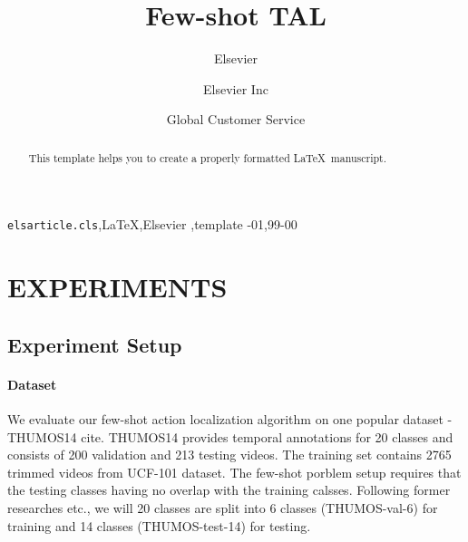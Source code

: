 \documentclass[review]{elsarticle}
\newcommand{\yl}[1]{\textcolor[rgb]{1.00,0.00,0.00}{#1}}
\begin{document}
\begin{frontmatter}

\title{Few-shot TAL}

\author{Elsevier}
\address{Radarweg 29, Amsterdam}

\author[mymainaddress,mysecondaryaddress]{Elsevier Inc}

\author[mysecondaryaddress]{Global Customer Service}

\address[mymainaddress]{1600 John F Kennedy Boulevard, Philadelphia}
\address[mysecondaryaddress]{360 Park Avenue South, New York}

\begin{abstract}
This template helps you to create a properly formatted \LaTeX\ manuscript.
\end{abstract}

\begin{keyword}
\texttt{elsarticle.cls}\sep \LaTeX\sep Elsevier \sep template
-01\sep  99-00
\end{keyword}

\end{frontmatter}

\linenumbers

\section{EXPERIMENTS}
\subsection{Experiment Setup}

\paragraph{Dataset} We evaluate our few-shot action localization algorithm on one popular dataset - THUMOS14 \yl{cite}. THUMOS14 provides temporal annotations for 20 classes and consists of 200 validation and 213 testing videos. The training set contains 2765 trimmed videos from UCF-101 dataset. The few-shot porblem setup requires that the testing classes having no overlap with the training calsses. Following former researches \cite{Yang_2018_CVPR}\cite{Xu2018SimilarityRF}\cite{Xie2021FewShotAL} etc., we will 20 classes are split into 6 classes (THUMOS-val-6) for training and 14 classes (THUMOS-test-14) for testing. 
\end{document}
